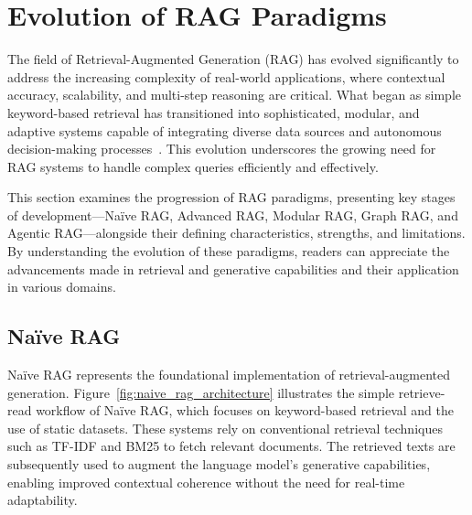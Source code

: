 \section{Evolution of RAG Paradigms}

The field of Retrieval-Augmented Generation (RAG) has evolved significantly to address the increasing complexity of real-world applications, where contextual accuracy, scalability, and multi-step reasoning are critical. What began as simple keyword-based retrieval has transitioned into sophisticated, modular, and adaptive systems capable of integrating diverse data sources and autonomous decision-making processes~\cite{lewis2020retrieval,kabir2024hybridrag,chen2024ext2gen}. This evolution underscores the growing need for RAG systems to handle complex queries efficiently and effectively.

This section examines the progression of RAG paradigms, presenting key stages of development---Naïve RAG, Advanced RAG, Modular RAG, Graph RAG, and Agentic RAG---alongside their defining characteristics, strengths, and limitations. By understanding the evolution of these paradigms, readers can appreciate the advancements made in retrieval and generative capabilities and their application in various domains.


\subsection{Naïve RAG}
Naïve RAG \cite{lewis2020retrieval} represents the foundational implementation of retrieval-augmented generation. Figure~\ref{fig:naive_rag_architecture} illustrates the simple retrieve-read workflow of Naïve RAG, which focuses on keyword-based retrieval and the use of static datasets. These systems rely on conventional retrieval techniques such as TF-IDF and BM25 to fetch relevant documents. The retrieved texts are subsequently used to augment the language model’s generative capabilities, enabling improved contextual coherence without the need for real-time adaptability.


